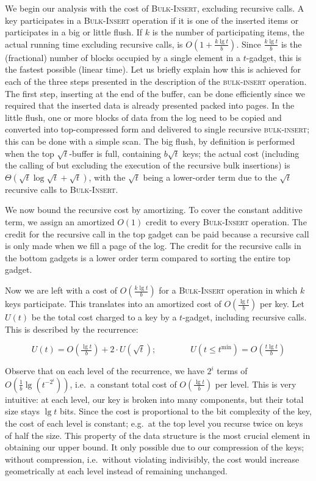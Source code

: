 \documentclass[letterpaper,11pt]{article}
\newcommand{\proc}[1]{\textnormal{\scshape#1}}
\newcommand{\tmin}{t^{\min}}
\begin{document}
We begin our analysis with the cost of \proc{Bulk-Insert}, excluding
recursive calls. A key participates in a \proc{Bulk-Insert} operation
if it is one of the inserted items or participates in a big or little
flush. If $k$ is the number of participating items, the actual running
time excluding recursive calls, is $O(1+\frac{k\lg t}{b})$. Since
$\frac{k\lg t}{b}$ is the (fractional) number of blocks occupied by a
single element in a $t$-gadget, this is the fastest possible (linear
time). Let us briefly explain how this is achieved for each of the
three steps presented in the description of the \proc{bulk-insert}
operation. The first step, inserting at the end of the buffer, can be
done efficiently since we required that the inserted data is already
presented packed into pages. In the little flush, one or more blocks
of data from the log need to be copied and converted into
top-compressed form and delivered to single recursive
\proc{bulk-insert}; this can be done with a simple scan. The big
flush, by definition is performed when the top $\sqrt{t}$-buffer is
full, containing $b\sqrt{t}$ keys; the actual cost (including the
calling of but excluding the execution of the recursive bulk
insertions) is $\Theta(\sqrt{t} \log \sqrt{t}+\sqrt{t})$, with the
$\sqrt{t}$ being a lower-order term due to the $\sqrt{t}$ recursive
calls to \proc{Bulk-Insert}.

We now bound the recursive cost by amortizing. To cover the constant
additive term, we assign an amortized $O(1)$ credit to every
\proc{Bulk-Insert} operation. The credit for the recursive call in the
top gadget can be paid because a recursive call is only made when we
fill a page of the log. The credit for the recursive calls in the
bottom gadgets is a lower order term compared to sorting the entire
top gadget.

Now we are left with a cost of $O(\frac{k\lg t}{b})$ for a
\proc{Bulk-Insert} operation in which $k$ keys participate. This
translates into an amortized cost of $O(\frac{\lg t}{b})$ per key. Let
$U(t)$ be the total cost charged to a key by a $t$-gadget, including
recursive calls. This is described by the recurrence:

\[ U(t) = O(\tfrac{\lg t}{b}) + 2 \cdot U(\sqrt{t});
\qquad\qquad 
U(t \leq \tmin) = O(\tfrac{t\lg t}{b})
\]

Observe that on each level of the recurrence, we have $2^i$ terms of
$O(\frac{1}{b} \lg(t^{-2^i}))$, i.e.~a constant total cost of
$O(\frac{\lg t}{b})$ per level. This is very intuitive: at each level,
our key is broken into many components, but their total size stays
$\lg t$ bits. Since the cost is proportional to the bit complexity of
the key, the cost of each level is constant; e.g.~at the top level you
recurse twice on keys of half the size. This property of the data
structure is the most crucial element in obtaining our upper bound. It
only possible due to our compression of the keys; without compression,
i.e.~without violating indivisibly, the cost would increase
geometrically at each level instead of remaining unchanged.
\end{document}
